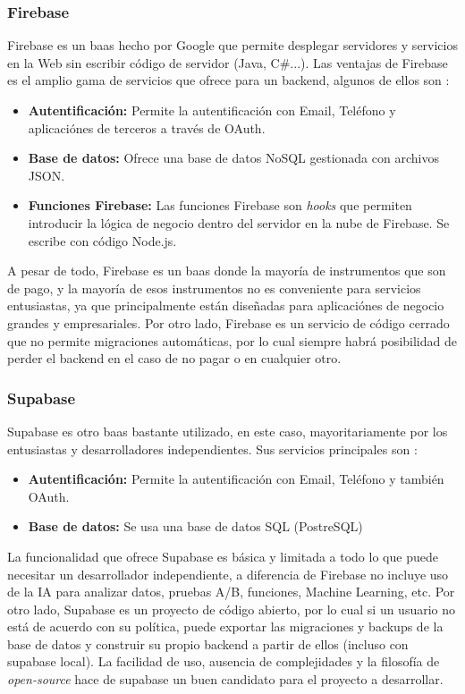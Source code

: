 \subsubsection{Firebase}
Firebase es un \gls{baas} hecho por Google que permite desplegar servidores y servicios en la Web sin escribir código de servidor (Java, C\#...). Las ventajas de Firebase es el amplio gama de servicios que ofrece para un backend, algunos de ellos son \citep{firebase}:
\begin{itemize}
	\item \textbf{Autentificación:} Permite la autentificación con Email, Teléfono y aplicaciónes de terceros a través de OAuth.
	\item \textbf{Base de datos:} Ofrece una base de datos NoSQL gestionada con archivos JSON.
	\item \textbf{Funciones Firebase:} Las funciones Firebase son \textit{hooks} que permiten introducir la lógica de negocio dentro del servidor en la nube de Firebase. Se escribe con código Node.js.
\end{itemize}
\par A pesar de todo, Firebase es un \gls{baas} donde la mayoría de instrumentos que son de pago, y la mayoría de esos instrumentos no es conveniente para servicios entusiastas, ya que principalmente están diseñadas para aplicaciónes de negocio grandes y empresariales. Por otro lado, Firebase es un servicio de código cerrado que no permite migraciones automáticas, por lo cual siempre habrá posibilidad de perder el backend en el caso de no pagar o en cualquier otro.
\subsubsection{Supabase}
Supabase es otro \gls{baas} bastante utilizado, en este caso, mayoritariamente por los entusiastas y desarrolladores independientes. Sus servicios principales son \citep{supabase}:
\begin{itemize}
	\item \textbf{Autentificación:} Permite la autentificación con Email, Teléfono y también OAuth.
	\item \textbf{Base de datos:} Se usa una base de datos SQL (PostreSQL)
\end{itemize}
\par La funcionalidad que ofrece Supabase es básica y limitada a todo lo que puede necesitar un desarrollador independiente, a diferencia de Firebase no incluye uso de la IA para analizar datos, pruebas A/B, funciones, Machine Learning, etc. Por otro lado, Supabase es un proyecto de código abierto, por lo cual si un usuario no está de acuerdo con su política, puede exportar las migraciones y backups de la base de datos y construir su propio backend a partir de ellos (incluso con supabase local). La facilidad de uso, ausencia de complejidades y la filosofía de \textit{open-source} hace de supabase un buen candidato para el proyecto a desarrollar.
